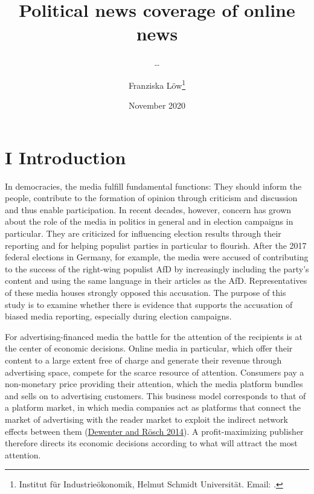 \documentclass[
]{article}
\title{Political news coverage of online news}
\subtitle{\ldots{}}
\author{Franziska Löw\footnote{Institut für Industrieökonomik, Helmut
  Schmidt Universität. Email: .}}
\date{November 2020}
\begin{document}
\maketitle

\hypertarget{i-introduction}{%
\section{I Introduction}\label{i-introduction}}

In democracies, the media fulfill fundamental functions: They should
inform the people, contribute to the formation of opinion through
criticism and discussion and thus enable participation. In recent
decades, however, concern has grown about the role of the media in
politics in general and in election campaigns in particular. They are
criticized for influencing election results through their reporting and
for helping populist parties in particular to flourish. After the 2017
federal elections in Germany, for example, the media were accused of
contributing to the success of the right-wing populist AfD by
increasingly including the party's content and using the same language
in their articles as the AfD. Representatives of these media houses
strongly opposed this accusation. The purpose of this study is to
examine whether there is evidence that supports the accusation of biased
media reporting, especially during election campaigns.

For advertising-financed media the battle for the attention of the
recipients is at the center of economic decisions. Online media in
particular, which offer their content to a large extent free of charge
and generate their revenue through advertising space, compete for the
scarce resource of attention. Consumers pay a non-monetary price
providing their attention, which the media platform bundles and sells on
to advertising customers. This business model corresponds to that of a
platform market, in which media companies act as platforms that connect
the market of advertising with the reader market to exploit the indirect
network effects between them
(\protect\hyperlink{ref-dewenter_einfuhrung_2014}{Dewenter and Rösch
2014}). A profit-maximizing publisher therefore directs its economic
decisions according to what will attract the most attention.
\end{document}

